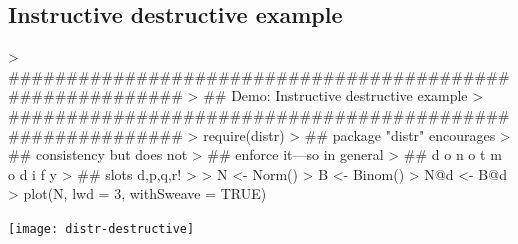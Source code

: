 \documentclass[11pt]{article}
\begin{document}
\subsection{Instructive destructive example}\label{destrex}
\begin{Schunk}
\begin{Sinput}
> ##########################################################
> ## Demo: Instructive destructive example
> ##########################################################
> require(distr)
> ## package "distr" encourages
> ## consistency but does not
> ## enforce it---so in general
> ## d o   n o t   m o d i f y
> ## slots d,p,q,r!
>
> N <- Norm()
> B <- Binom()
> N@d <- B@d
> plot(N, lwd = 3, withSweave = TRUE)
\end{Sinput}
\end{Schunk}
\texttt{[image: distr-destructive]}
\end{document}
